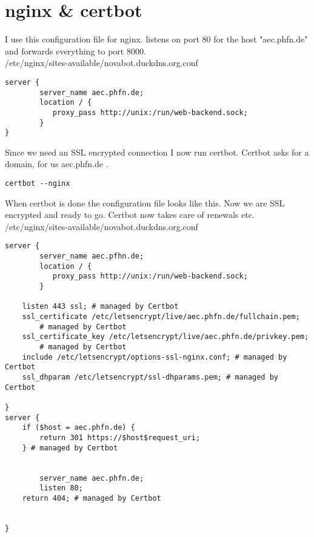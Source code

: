 \section{nginx \& certbot}
I use this configuration file for nginx. listens on port 80
for the host "aec.phfn.de" and forwards everything
to port 8000.\\
/etc/nginx/sites-available/novabot.duckdns.org.conf
\begin{verbatim}
server {
        server_name aec.phfn.de;
        location / {
           proxy_pass http://unix:/run/web-backend.sock;
        }
}
\end{verbatim}
Since we need an SSL encrypted connection I now run certbot.
Certbot asks for a domain, for us aec.phfn.de .
\begin{verbatim}
certbot --nginx
\end{verbatim}
When certbot is done the configuration file looks like this.
Now we are SSL encrypted and ready to go. Certbot now takes
care of renewals etc.\\
/etc/nginx/sites-available/novabot.duckdns.org.conf
\begin{verbatim}
server {
        server_name aec.pfhn.de;
        location / {
           proxy_pass http://unix:/run/web-backend.sock;
        }
 
    listen 443 ssl; # managed by Certbot
    ssl_certificate /etc/letsencrypt/live/aec.phfn.de/fullchain.pem;
	    # managed by Certbot
    ssl_certificate_key /etc/letsencrypt/live/aec.phfn.de/privkey.pem;
	    # managed by Certbot
    include /etc/letsencrypt/options-ssl-nginx.conf; # managed by Certbot
    ssl_dhparam /etc/letsencrypt/ssl-dhparams.pem; # managed by Certbot
 
}
server {
    if ($host = aec.phfn.de) {
        return 301 https://$host$request_uri;
    } # managed by Certbot
 
 
        server_name aec.phfn.de;
        listen 80;
    return 404; # managed by Certbot
 
 
}
\end{verbatim}
